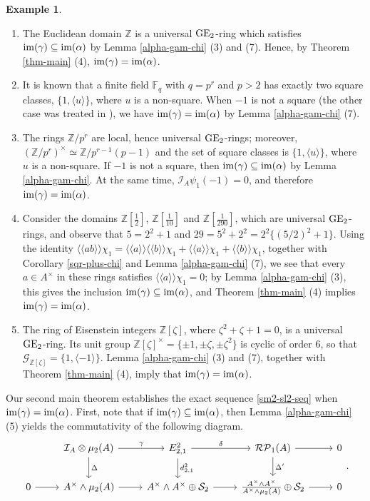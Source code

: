 \documentclass[11pt]{amsart}
\theoremstyle{definition}
\theoremstyle{plain}
\theoremstyle{definition}
\newtheorem{exm}[ntn]{Example}
\numberwithin{equation}{section}
\newcommand{\z}{\mathbb{Z}}
\newcommand{\F}{\mathbb{F}}
\newcommand{\GG}{\mathcal{G}}
\newcommand{\II}{\mathcal{I}}
\newcommand{\RP}{\mathcal{RP}}
\renewcommand{\SS}{\mathcal{S}}
\renewcommand{\aa}{{A^\times}}
\newcommand{\lan}{\langle}
\newcommand{\ran}{\rangle}
\newcommand{\Lan}{\langle \! \langle}
\newcommand{\Ran}{\rangle \! \rangle}
\newcommand{\GE}{{\rm GE}}
\newcommand{\im}{{\rm im}}
\begin{document}
	\begin{exm}\label{ex-im-eq}
		\begin{enumerate}
			\item The Euclidean domain $\z$ is a universal $\GE_2$-ring which satisfies $\im(\gamma)\subseteq\im(\alpha)$ by Lemma \ref{alpha-gam-chi} (3) and (7). Hence, by Theorem \ref{thm-main} (4), $\im(\gamma)=\im(\alpha)$.
			\item It is known that a finite field $\F_q$ with $q=p^r$ and $p>2$ has exactly two square classes, $\{1,\langle u\rangle\}$, where $u$ is a non-square. When $-1$ is not a square (the other case was treated in \cite{B-E--2023}), we have $\im(\gamma)=\im(\alpha)$ by Lemma \ref{alpha-gam-chi} (7).
			\item The rings $\z/p^r$ are local, hence universal $\GE_2$-rings; moreover, $(\z/p^r)^\times\simeq\z/p^{r-1}(p-1)$ and the set of square classes is $\{1,\langle u\rangle\}$, where $u$ is a non-square. If $-1$ is not a square, then $\im(\gamma)\subseteq\im(\alpha)$ by Lemma \ref{alpha-gam-chi}. At the same time, $\II_A\psi_1(-1)=0$, and therefore $\im(\gamma)=\im(\alpha)$.
			\item Consider the domains $\z\left[\frac{1}{2}\right]$, $\z\left[\frac{1}{10}\right]$ and $\z\left[\frac{1}{290}\right]$, which are universal $\GE_2$-rings, and observe that $5=2^2+1$ and $29=5^2+2^2=2^2\{(5/2)^2+1\}$. Using the identity $\Lan ab\Ran\chi_1=\Lan a\Ran\Lan b\Ran\chi_1+\Lan a\Ran\chi_1+\Lan b\Ran\chi_1$, together with Corollary \ref{sqr-plus-chi} and Lemma \ref{alpha-gam-chi} (7), we see that every $a\in\aa$ in these rings satisfies $\Lan a\Ran\chi_1=0$; by Lemma \ref{alpha-gam-chi} (3), this gives the inclusion $\im(\gamma)\subseteq\im(\alpha)$, and Theorem \ref{thm-main} (4) implies $\im(\gamma)=\im(\alpha)$.
			\item The ring of Eisenstein integers $\z[\zeta]$, where $\zeta^2+\zeta+1=0$, is a universal $\GE_2$-ring. Its unit group $\z[\zeta]^\times=\{\pm 1,\pm\zeta,\pm\zeta^2\}$ is cyclic of order $6$, so that $\GG_{\z[\zeta]}=\{1,\lan-1\ran\}$. Lemma \ref{alpha-gam-chi} (3) and (7), together with Theorem \ref{thm-main} (4), imply that $\im(\gamma)=\im(\alpha)$.
		\end{enumerate}
	\end{exm}
	Our second main theorem establishes the exact sequence \eqref{sm2-sl2-seq} when $\im(\gamma)=\im(\alpha)$. First, note that if $\im(\gamma)\subseteq\im(\alpha)$, then Lemma \ref{alpha-gam-chi} (5) yields the commutativity of the following diagram.
	\begin{equation}
		\begin{tikzcd}
			& \II_A\otimes\mu_2(A)\ar[r,"\gamma"]\ar[d,"\Delta"] & E^2_{2,1}\ar[r,"\delta"]\ar[d,"d^2_{2,1}"] & \RP_1(A)\ar[r]\ar[d,"\Delta'"] & 0\\
			0\ar[r] & \aa\wedge\mu_2(A)\ar[r] & \aa\wedge\aa\oplus \SS_2\ar[r] & \frac{\aa\wedge\aa}{\aa\wedge\mu_2(A)}\oplus \SS_2\ar[r] & 0
		\end{tikzcd}.
	\end{equation}
\end{document}
